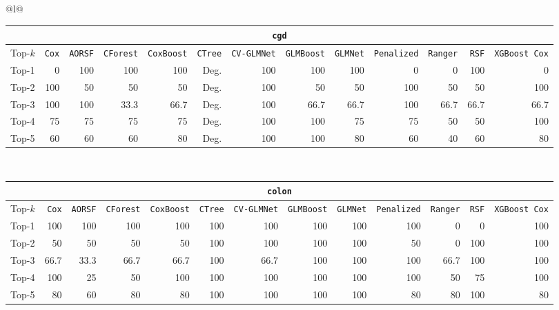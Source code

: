 \begin{longtable}{@{}l@{}}
\begin{tabular}{@{}l*{12}{r}@{}}
\multicolumn{13}{c}{\texttt{cgd}} \\
\midrule
Top-$k$ & \texttt{Cox} & \texttt{AORSF} & \texttt{CForest} & \texttt{CoxBoost} & \texttt{CTree} & \texttt{CV-GLMNet} & \texttt{GLMBoost} & \texttt{GLMNet} & \texttt{Penalized} & \texttt{Ranger} & \texttt{RSF} & \texttt{XGBoost Cox} \\
\midrule
Top-1 & 0 & 100 & 100 & 100 & Deg. & 100 & 100 & 100 & 0 & 0 & 100 & 0 \\
Top-2 & 100 & 50 & 50 & 50 & Deg. & 100 & 50 & 50 & 100 & 50 & 50 & 100 \\
Top-3 & 100 & 100 & 33.3 & 66.7 & Deg. & 100 & 66.7 & 66.7 & 100 & 66.7 & 66.7 & 66.7 \\
Top-4 & 75 & 75 & 75 & 75 & Deg. & 100 & 100 & 75 & 75 & 50 & 50 & 100 \\
Top-5 & 60 & 60 & 60 & 80 & Deg. & 100 & 100 & 80 & 60 & 40 & 60 & 80 \\
\end{tabular} \\
\midrule

\begin{tabular}{@{}l*{12}{r}@{}}
\multicolumn{13}{c}{\texttt{colon}} \\
\midrule
Top-$k$ & \texttt{Cox} & \texttt{AORSF} & \texttt{CForest} & \texttt{CoxBoost} & \texttt{CTree} & \texttt{CV-GLMNet} & \texttt{GLMBoost} & \texttt{GLMNet} & \texttt{Penalized} & \texttt{Ranger} & \texttt{RSF} & \texttt{XGBoost Cox} \\
\midrule
Top-1 & 100 & 100 & 100 & 100 & 100 & 100 & 100 & 100 & 100 & 0 & 0 & 100 \\
Top-2 & 50 & 50 & 50 & 50 & 100 & 100 & 100 & 100 & 50 & 0 & 100 & 100 \\
Top-3 & 66.7 & 33.3 & 66.7 & 66.7 & 100 & 66.7 & 100 & 100 & 100 & 66.7 & 100 & 100 \\
Top-4 & 100 & 25 & 50 & 100 & 100 & 100 & 100 & 100 & 100 & 50 & 75 & 100 \\
Top-5 & 80 & 60 & 80 & 80 & 100 & 100 & 100 & 100 & 80 & 80 & 100 & 80 \\
\end{tabular} \\
\midrule


\end{longtable}
